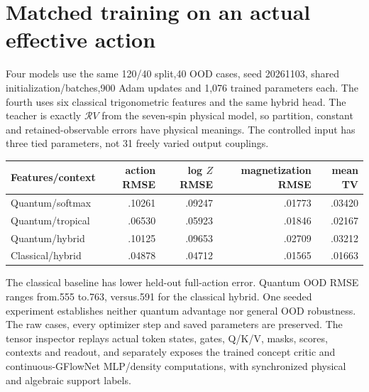 \section{Matched training on an actual effective action}
Four models use the same 120/40 split,40 OOD cases, seed 20261103, shared
initialization/batches,900 Adam updates and 1,076 trained parameters each.
The fourth uses six classical trigonometric features and the same hybrid
head. The teacher is exactly $\mathcal RV $ from the seven-spin physical
model, so partition, constant and retained-observable errors have physical
meanings. The controlled input has three tied parameters, not 31 freely
varied output couplings.
\begin{center}\small
\begin{tabular}{lrrrr}
Features/context&action RMSE&log $ Z $ RMSE&magnetization RMSE&mean TV\\\hline
Quantum/softmax&.10261&.09247&.01773&.03420\\
Quantum/tropical&.06530&.05923&.01846&.02167\\
Quantum/hybrid&.10125&.09653&.02709&.03212\\
Classical/hybrid&.04878&.04712&.01565&.01663
\end{tabular}
\end{center}
The classical baseline has lower held-out full-action error. Quantum OOD
RMSE ranges from.555 to.763, versus.591 for the classical hybrid. One seeded
experiment establishes neither quantum advantage nor general OOD robustness.
The raw cases, every optimizer step and saved parameters are preserved.
The tensor inspector replays actual token states, gates, Q/K/V, masks, scores,
contexts and readout, and separately exposes the trained concept critic and
continuous-GFlowNet MLP/density computations, with synchronized physical and algebraic support labels.

